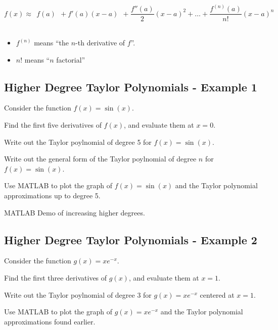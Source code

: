 $$ f(x) \approx ~~f(a) ~~+ f'(a) (x-a) ~~+ \frac{f''(a)}{2} (x-a)^2 + \ldots 
+ \frac{f^{(n)}(a)}{n!} (x-a)^n$$   \\

\begin{itemize}
\item $f^{(n)}$ means ``the $n$-th derivative of $f$''. \\
\item $n!$ means ``$n$ factorial''
\end{itemize}

\newpage
\subsection*{Higher Degree Taylor Polynomials - Example 1}

Consider the function $f(x) = \sin(x)$.

\problem Find the first five derivatives of $f(x)$, and evaluate them at $x=0$.


\newpage

\problem Write out the Taylor poylnomial of degree 5 for
$f(x) = \sin(x)$.

\vfill

\problem Write out the general form of the Taylor poylnomial of degree
$n$ for $f(x) = \sin(x)$.

\vfill

\newpage

\problem Use MATLAB to plot the graph of $f(x) = \sin(x)$ and the
Taylor polynomial approximations up to degree 5.

\newpage

MATLAB Demo of increasing higher degrees.


\subsection*{Higher Degree Taylor Polynomials - Example 2}

Consider the function $g(x) = x e^{-x}$.

\problem Find the first three derivatives of $g(x)$, and evaluate them
at $x=1$.


\newpage

\problem Write out the Taylor poylnomial of degree 3 for
$g(x) = x e^{-x}$ centered at $x=1$.

\vfill

\newpage

\problem Use MATLAB to plot the graph of $g(x) = x e^{-x}$ and the
Taylor polynomial approximations found earlier.

